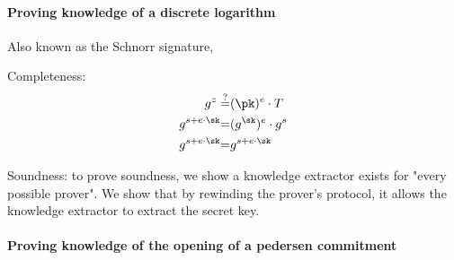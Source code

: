 \paragraph{Proving knowledge of a discrete logarithm}
Also known as the Schnorr signature, 


Completeness: 
\begin{equation}
    \begin{aligned}
        g^{z} \stackrel{?}{=}& (\pk)^e \cdot T\\
        g^{s + e\cdot\sk} {=}& (g^{\sk})^e \cdot g^s\\
        g^{s + e\cdot\sk} {=}& g^{s + e\cdot\sk}\\
    \end{aligned}
\end{equation}

Soundness: to prove soundness, we show a knowledge extractor exists for "every possible prover". We show that by rewinding the prover's protocol, it allows the knowledge extractor to extract the secret key.

\paragraph{Proving knowledge of the opening of a pedersen commitment}

